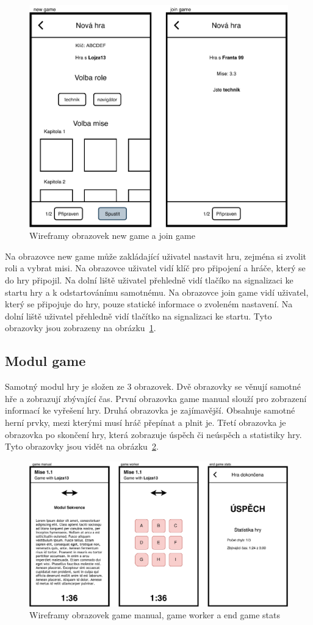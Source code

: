 \begin{figure}
    \centering
    \includegraphics[width=0.6\linewidth]{assets/design/wireframes/lobby.pdf}
    \caption{Wireframy obrazovek new game a join game}
    \label{fig:ui-lobby}
\end{figure}

Na obrazovce new game může zakládající uživatel nastavit hru,
zejména si zvolit roli a vybrat misi.
Na obrazovce uživatel vidí klíč pro připojení a hráče,
který se do hry připojil.
Na dolní liště uživatel přehledně vidí tlačíko na signalizaci ke startu hry
a k odstartovánímu samotnému.
Na obrazovce join game vidí uživatel,
který se připojuje do hry,
pouze statické informace o zvoleném nastavení.
Na dolní liště uživatel přehledně vidí tlačítko na signalizaci ke startu.
Tyto obrazovky jsou zobrazeny na obrázku~\ref{fig:ui-lobby}.

\subsection{Modul game}

Samotný modul hry je složen ze 3 obrazovek.
Dvě obrazovky se věnují samotné hře a zobrazují zbývající čas.
První obrazovka game manual slouží pro zobrazení informací ke vyřešení hry.
Druhá obrazovka je zajímavější.
Obsahuje samotné herní prvky,
mezi kterými musí hráč přepínat a plnit je.
Třetí obrazovka je obrazovka po skončení hry,
která zobrazuje úspěch či neúspěch
a statistiky hry.
Tyto obrazovky jsou vidět na obrázku~\ref{fig:ui-game}.

\begin{figure}
    \centering
    \includegraphics[width=1\linewidth]{assets/design/wireframes/game.pdf}
    \caption{Wireframy obrazovek game manual, game worker a end game stats}
    \label{fig:ui-game}
\end{figure}
